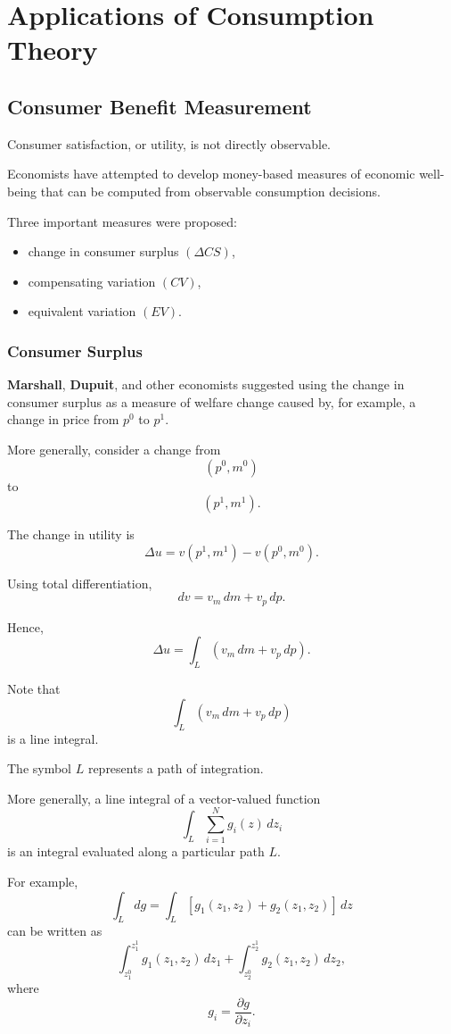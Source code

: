 \chapter{Applications of Consumption Theory}

\section{Consumer Benefit Measurement}

Consumer satisfaction, or utility, is not directly observable.

Economists have attempted to develop money-based measures of economic well-being that can be computed from observable consumption decisions.

Three important measures were proposed:

\begin{itemize}
    \item change in consumer surplus \((\Delta CS)\),
    \item compensating variation \((CV)\),
    \item equivalent variation \((EV)\).
\end{itemize}

\subsection{Consumer Surplus}

\textbf{Marshall}, \textbf{Dupuit}, and other economists suggested using the change in consumer surplus as a measure of welfare change caused by, for example, a change in price from \(p^0\) to \(p^1\).

More generally, consider a change from
\[
(p^0,m^0)
\]
to
\[
(p^1,m^1).
\]

The change in utility is
\[
\Delta u
=
v(p^1,m^1)-v(p^0,m^0).
\]

Using total differentiation,
\[
dv
=
v_m\,dm+v_p\,dp.
\]

Hence,
\[
\Delta u
=
\int_L (v_m\,dm+v_p\,dp).
\]

Note that
\[
\int_L (v_m\,dm+v_p\,dp)
\]
is a line integral.

The symbol \(L\) represents a path of integration.

More generally, a line integral of a vector-valued function
\[
\int_L \sum_{i=1}^N g_i(z)\,dz_i
\]
is an integral evaluated along a particular path \(L\).

For example,
\[
\int_L dg
=
\int_L
[g_1(z_1,z_2)+g_2(z_1,z_2)]\,dz
\]
can be written as
\[
\int_{z_1^0}^{z_1^1}
g_1(z_1,z_2)\,dz_1
+
\int_{z_2^0}^{z_2^1}
g_2(z_1,z_2)\,dz_2,
\]
where
\[
g_i
=
\frac{\partial g}{\partial z_i}.
\]

